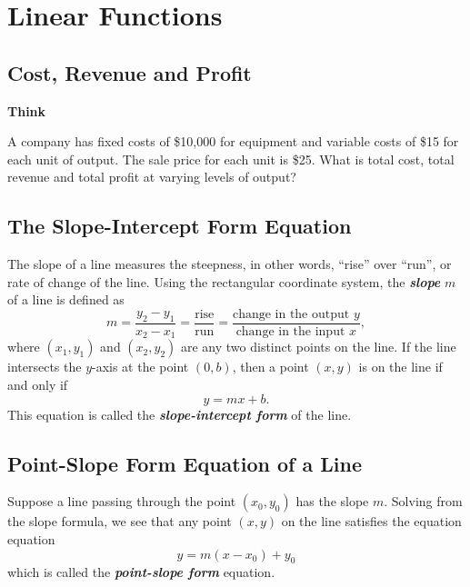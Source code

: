 \documentclass[en,12pt]{elegantbook}
\newenvironment{rmdthink}{
	\par\noindent
	{
		\makebox[-\width][r]{
			\footnotesize
			\color{green!90}\faLightbulbO
			\hspace*{3pt}
		}
			\textbf{
				\color{second}
				Think 
			}
    }
    \begin{shaded}
    \sffamily
}{
    \par\medskip\ignorespacesafterend
    \end{shaded}
}
\begin{document}
\hypertarget{linear-functions}{%
\chapter{Linear Functions}\label{linear-functions}}

\hypertarget{cost-revenue-and-profit}{%
\section{Cost, Revenue and Profit}\label{cost-revenue-and-profit}}

\begin{rmdthink}

A company has fixed costs of \$10,000 for equipment and variable costs of \$15 for each unit of output. The sale price for each unit is \$25. What is total cost, total revenue and total profit at varying levels of output?

\end{rmdthink}

\hypertarget{the-slope-intercept-form-equation}{%
\section{The Slope-Intercept Form Equation}\label{the-slope-intercept-form-equation}}

The slope of a line measures the steepness, in other words, ``rise'' over ``run'', or rate of change of the line. Using the rectangular coordinate system, the \textbf{\emph{slope}} \(m\) of a line is defined as
\[
m=\dfrac{y_2-y_1}{x_2-x_1}=\dfrac{\text{rise}}{\text{run}}=\dfrac{\text{change in the output }y}{\text{change in the input } x},
\]
where \((x_1, y_1)\) and \((x_2, y_2)\) are any two distinct points on the line. If the line intersects the \(y\)-axis at the point \((0, b)\), then a point \((x, y)\) is on the line if and only if
\[
y=mx+b.
\]
This equation is called the \textbf{\emph{slope-intercept form}} of the line.

\hypertarget{point-slope-form-equation-of-a-line}{%
\section{Point-Slope Form Equation of a Line}\label{point-slope-form-equation-of-a-line}}

Suppose a line passing through the point \((x_0, y_0)\) has the slope \(m\). Solving from the slope formula, we see that any point \((x, y)\) on the line satisfies the equation equation
\[
y=m(x-x_0)+y_0
\]
which is called the \textbf{\emph{point-slope form}} equation.
\end{document}
